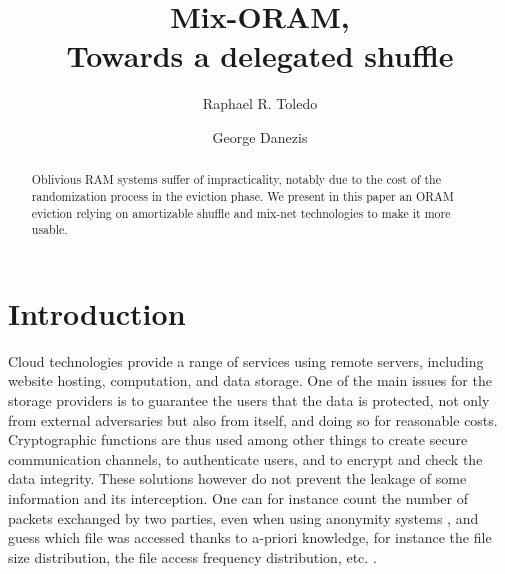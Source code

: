 \documentclass{llncs}
\begin{document}
\title{Mix-ORAM,\\ Towards a delegated shuffle}
%
%
\author{Raphael R. Toledo \and George Danezis}
%
%
%

\maketitle              %

\begin{abstract}
Oblivious RAM systems suffer of impracticality, notably due to the cost of the randomization process in the eviction phase.
We present in this paper an ORAM eviction relying on amortizable shuffle and mix-net technologies to make it more usable.
\end{abstract}
%
\section{Introduction}\label{Introduction}
%
Cloud technologies provide a range of services using remote servers, including website hosting, computation, and data storage. One of the main issues for the storage providers is to guarantee the users that the data is protected, not only from external adversaries but also from itself, and doing so for reasonable costs. 
Cryptographic functions are thus used among other things to create secure communication channels, to authenticate users, and to encrypt and check the data integrity.
These solutions however do not prevent the leakage of some information and its interception. One can for instance count the number of packets exchanged by two parties, even when using anonymity systems \cite{murdoch2005}, and guess which file was accessed thanks to a-priori knowledge, for instance the file size distribution, the file access frequency distribution, etc. .
\end{document}
